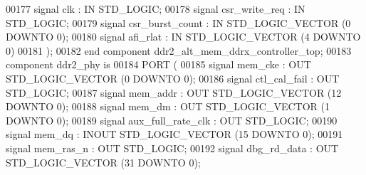 \begin{DoxyCode}
00177         \textcolor{keywordflow}{signal} clk : \textcolor{keywordflow}{IN} \textcolor{comment}{STD\_LOGIC};
00178         \textcolor{keywordflow}{signal} csr\_write\_req : \textcolor{keywordflow}{IN} \textcolor{comment}{STD\_LOGIC};
00179         \textcolor{keywordflow}{signal} csr\_burst\_count : \textcolor{keywordflow}{IN} \textcolor{comment}{STD\_LOGIC\_VECTOR} (\textcolor{vhdllogic}{}\textcolor{vhdllogic}{0} \textcolor{keywordflow}{DOWNTO} \textcolor{vhdllogic}{}\textcolor{vhdllogic}{0});
00180         \textcolor{keywordflow}{signal} afi\_rlat : \textcolor{keywordflow}{IN} \textcolor{comment}{STD\_LOGIC\_VECTOR} (\textcolor{vhdllogic}{}\textcolor{vhdllogic}{4} \textcolor{keywordflow}{DOWNTO} \textcolor{vhdllogic}{}\textcolor{vhdllogic}{0})
00181       );
00182   \textcolor{keywordflow}{end} \textcolor{keywordflow}{component} \textcolor{vhdlchar}{ddr2_alt_mem_ddrx_controller_top};
00183   \textcolor{keywordflow}{component} ddr2_phy \textcolor{keywordflow}{is}
00184 \textcolor{keywordflow}{PORT} (
00185     \textcolor{keywordflow}{signal} mem_cke : \textcolor{keywordflow}{OUT} \textcolor{comment}{STD\_LOGIC\_VECTOR} (\textcolor{vhdllogic}{}\textcolor{vhdllogic}{0} \textcolor{keywordflow}{DOWNTO} \textcolor{vhdllogic}{}\textcolor{vhdllogic}{0});
00186         \textcolor{keywordflow}{signal} ctl_cal_fail : \textcolor{keywordflow}{OUT} \textcolor{comment}{STD\_LOGIC};
00187         \textcolor{keywordflow}{signal} mem_addr : \textcolor{keywordflow}{OUT} \textcolor{comment}{STD\_LOGIC\_VECTOR} (\textcolor{vhdllogic}{}\textcolor{vhdllogic}{12} \textcolor{keywordflow}{DOWNTO} \textcolor{vhdllogic}{}\textcolor{vhdllogic}{0});
00188         \textcolor{keywordflow}{signal} mem_dm : \textcolor{keywordflow}{OUT} \textcolor{comment}{STD\_LOGIC\_VECTOR} (\textcolor{vhdllogic}{}\textcolor{vhdllogic}{1} \textcolor{keywordflow}{DOWNTO} \textcolor{vhdllogic}{}\textcolor{vhdllogic}{0});
00189         \textcolor{keywordflow}{signal} aux_full_rate_clk : \textcolor{keywordflow}{OUT} \textcolor{comment}{STD\_LOGIC};
00190         \textcolor{keywordflow}{signal} mem_dq : \textcolor{keywordflow}{INOUT} \textcolor{comment}{STD\_LOGIC\_VECTOR} (\textcolor{vhdllogic}{}\textcolor{vhdllogic}{15} \textcolor{keywordflow}{DOWNTO} \textcolor{vhdllogic}{}\textcolor{vhdllogic}{0});
00191         \textcolor{keywordflow}{signal} mem_ras_n : \textcolor{keywordflow}{OUT} \textcolor{comment}{STD\_LOGIC};
00192         \textcolor{keywordflow}{signal} dbg_rd_data : \textcolor{keywordflow}{OUT} \textcolor{comment}{STD\_LOGIC\_VECTOR} (\textcolor{vhdllogic}{}\textcolor{vhdllogic}{31} \textcolor{keywordflow}{DOWNTO} \textcolor{vhdllogic}{}\textcolor{vhdllogic}{0});

\end{DoxyCode}
